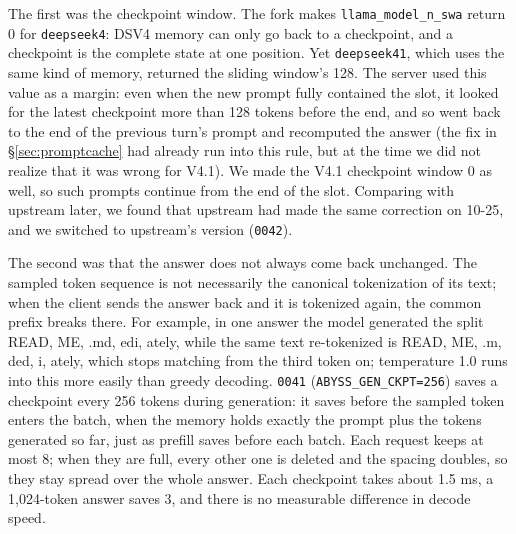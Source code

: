 \documentclass[11pt,a4paper]{article}
\newcommand{\code}[1]{\texttt{#1}}
\begin{document}
The first was the checkpoint window. The fork makes \code{llama\_model\_n\_swa} return 0 for \code{deepseek4}: DSV4 memory can only go back to a checkpoint, and a checkpoint is the complete state at one position. Yet \code{deepseek41}, which uses the same kind of memory, returned the sliding window's 128. The server used this value as a margin: even when the new prompt fully contained the slot, it looked for the latest checkpoint more than 128 tokens before the end, and so went back to the end of the previous turn's prompt and recomputed the answer (the fix in \S\ref{sec:promptcache} had already run into this rule, but at the time we did not realize that it was wrong for V4.1). We made the V4.1 checkpoint window 0 as well, so such prompts continue from the end of the slot. Comparing with upstream later, we found that upstream had made the same correction on 10-25, and we switched to upstream's version (\code{0042}).

The second was that the answer does not always come back unchanged. The sampled token sequence is not necessarily the canonical tokenization of its text; when the client sends the answer back and it is tokenized again, the common prefix breaks there. For example, in one answer the model generated the split READ, ME, .md, edi, ately, while the same text re-tokenized is READ, ME, .m, ded, i, ately, which stops matching from the third token on; temperature 1.0 runs into this more easily than greedy decoding. \code{0041} (\code{ABYSS\_GEN\_CKPT=256}) saves a checkpoint every 256 tokens during generation: it saves before the sampled token enters the batch, when the memory holds exactly the prompt plus the tokens generated so far, just as prefill saves before each batch. Each request keeps at most 8; when they are full, every other one is deleted and the spacing doubles, so they stay spread over the whole answer. Each checkpoint takes about 1.5 ms, a 1,024-token answer saves 3, and there is no measurable difference in decode speed.
\end{document}
